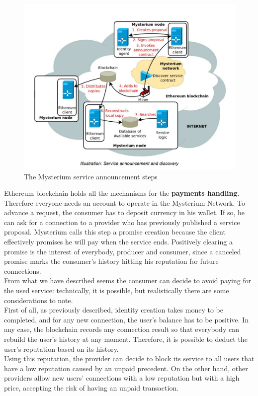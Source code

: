 \documentclass[]{article}
\begin{document}
	\begin{figure}
		\includegraphics[width=0.5\linewidth]{"images/mysterium_service_announcement.png"}
		\caption{The Mysterium service announcement steps}
	\end{figure}
	
	Ethereum blockchain holds all the mechanisms for the \textbf{payments handling}. Therefore everyone needs an account to operate in the Mysterium Network. To advance a request, the consumer has to deposit currency in his wallet. If so, he can ask for a connection to a provider who has previously published a service proposal. Mysterium calls this step a promise creation because the client effectively promises he will pay when the service ends. Positively clearing a promise is the interest of everybody, producer and consumer, since a canceled promise marks the consumer's history hitting his reputation for future connections.\\
	From what we have described seems the consumer can decide to avoid paying for the used service: technically, it is possible, but realistically there are some considerations to note.\\
	First of all, as previously described, identity creation takes money to be completed, and for any new connection, the user's balance has to be positive. In any case, the blockchain records any connection result so that everybody can rebuild the user's history at any moment. Therefore, it is possible to deduct the user's reputation based on its history.\\
	Using this reputation, the provider can decide to block its service to all users that have a low reputation caused by an unpaid precedent. On the other hand, other providers allow new users' connections with a low reputation but with a high price, accepting the risk of having an unpaid transaction.\\
	
\end{document}
